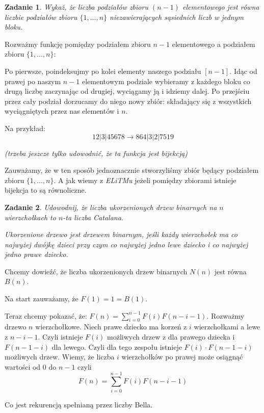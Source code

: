 \documentclass{mwbk}
\newtheorem{zad}{Zadanie}[chapter]
\begin{document}
\begin{zad}
    Wykaż, że liczba podziałów zbioru $(n - 1)$  elementowego jest równa
    liczbie podziałów zbioru $\{1, ..., n\}$ niezawierających sąsiednich liczb w jednym bloku.
\end{zad}
\begin{mdframed}
    Rozważmy funkcję
    pomiędzy podziałem zbioru $n-1$ elementowego
    a podziałem zbioru $\{1, ..., n\}$:

    Po pierwsze, poindeksujmy po kolei elementy naszego podziału $[n-1]$.
    Idąc od prawej po naszym $n-1$ elementowym podziale wybieramy z każdego bloku co drugą liczbę zaczynając od drugiej,
    wyciągamy ją i idziemy dalej. Po przejściu przez cały podział dorzucamy do niego nowy zbiór:
    składający się z wszystkich wyciągniętych przez nas elementów i $n$.

    Na przykład:
    \[ 12|3|45678 \to 864|3|2|7519\]

    \begin{center}
        \textit{(trzeba jeszcze tylko udowodnić, że ta funkcja jest bijekcją)}
    \end{center}

    Zauważamy, że w ten sposób jednoznacznie stworzyliśmy zbiór będący podziałem zbioru $\{1, ..., n\}$.
    A jak wiemy z \textit{ELiTMu} jeżeli pomiędzy zbiorami istnieje bijekcja to są równoliczne.
\end{mdframed}




\begin{zad}
    Udowodnij, że liczba ukorzenionych drzew binarnych na $n$ wierzchołkach to $n$-ta liczba Catalana.

    Ukorzenione drzewo jest drzewem binarnym, jeśli każdy wierzchołek ma co najwyżej
    dwójkę dzieci przy czym co najwyżej jedno lewe dziecko i co najwyżej jedno prawe dziecko.
\end{zad}
\begin{mdframed}
    Chcemy dowieźć, że liczba ukorzenionych drzew binarnych $N(n)$ jest równa $B(n)$.

    Na start zauważamy, że $F(1) = 1 = B(1)$.

    Teraz chcemy pokazać, że: $F(n) = \sum_{i=0}^{n-1}F(i)F(n-i-1)$.
    Rozważmy drzewo $n$ wierzchołkowe.
    Niech prawe dziecko ma korzeń z $i$ wierzchołkami a lewe z $n - i - 1$.
    Czyli istnieje $F(i)$ możliwych drzew z dla prawego dziecka i $F(n-1-i)$ dla lewego.
    Czyli dla tego zespołu istnieje $F(i) \cdot F(n-1-i)$ możliwych drzew.
    Wiemy, że liczba $i$ wierzchołków po prawej może osiągnąć wartości od $0$
    do $n-1$ czyli
    \[F(n) = \sum_{i=0}^{n-1}F(i)F(n-i-1)          \]

    Co jest rekurencją spełnianą przez liczby Bella.
\end{mdframed}
\end{document}
